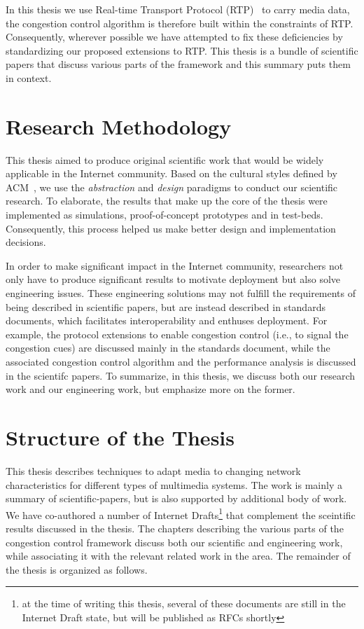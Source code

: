 In this thesis we use Real-time Transport Protocol (RTP)~\cite{rfc3550} to
carry media data, the congestion control algorithm is therefore built within
the constraints of RTP. Consequently, wherever possible we have attempted to
fix these deficiencies by standardizing our proposed extensions to RTP. This
thesis is a bundle of scientific papers that discuss various parts of the
framework and this summary puts them in context.


\section{Research Methodology}

This thesis aimed to produce original scientific work that would be widely
applicable in the Internet community. Based on the cultural styles defined by
ACM~\cite{Denning:CS.Method}, we use the \textit{abstraction} and
\textit{design} paradigms to conduct our scientific research. To elaborate,
the results that make up the core of the thesis were implemented as
simulations, proof-of-concept prototypes and in test-beds. Consequently, this
process helped us make better design and implementation decisions.

In order to make significant impact in the Internet community, researchers not
only have to produce significant results to motivate deployment but also solve
engineering issues. These engineering solutions may not fulfill the
requirements of being described in scientific papers, but are instead
described in standards documents, which facilitates interoperability and
enthuses deployment. For example, the protocol extensions to enable congestion
control (i.e., to signal the congestion cues) are discussed mainly in the
standards document, while the associated congestion control algorithm and the
performance analysis is discussed in the scientifc papers. To summarize, in
this thesis, we discuss both our research work and our engineering work, but
emphasize more on the former.



\section{Structure of the Thesis}

This thesis describes techniques to adapt media to changing network
characteristics for different types of multimedia systems. The work is mainly
a summary of scientific-papers, but is also supported by additional body of
work. We have co-authored a number of Internet Drafts\footnote{at the time of
writing this thesis, several of these documents are still in the Internet
Draft state, but will be published as RFCs shortly}
that complement the sceintific results discussed in the thesis. The chapters
describing the various parts of the congestion control framework discuss both
our scientific and engineering work, while associating it with the relevant
related work in the area. The remainder of the thesis is organized as follows.

